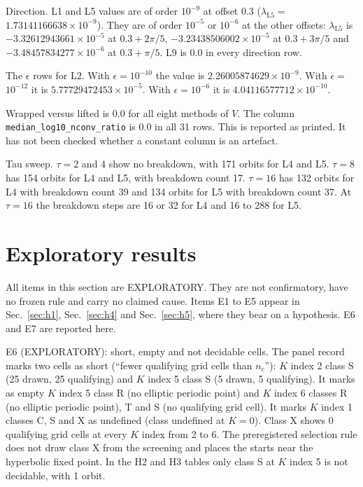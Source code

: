 \documentclass[aip,cha,reprint,amsmath,amssymb,longbibliography]{revtex4-2}
\newcommand{\sci}[2]{\ensuremath{#1\times10^{#2}}}
\newcommand{\tenp}[1]{\ensuremath{10^{#1}}}
\newcommand{\lam}[1]{\ensuremath{\lambda_{\mathrm{#1}}}}
\newcommand{\Sec}[1]{Sec.~\ref{#1}}
\begin{document}
Direction.
L1 and L5 values are of order \tenp{-9} at offset 0.3 ($\lam{L5}=$\sci{1.73141166638}{-9}).
They are of order \tenp{-5} or \tenp{-6} at the other offsets: $\lam{L5}$ is $-$\sci{3.32612943661}{-5} at $0.3+2\pi/5$, $-$\sci{3.23438506002}{-5} at $0.3+3\pi/5$ and $-$\sci{3.48457834277}{-6} at $0.3+\pi/5$.
L9 is 0.0 in every direction row.

The $\epsilon$ rows for L2.
With $\epsilon=$\tenp{-10} the value is \sci{2.26005874629}{-9}.
With $\epsilon=$\tenp{-12} it is \sci{5.77729472453}{-5}.
With $\epsilon=$\tenp{-6} it is \sci{4.04116577712}{-10}.

Wrapped versus lifted is 0.0 for all eight methods of $V$.
The column \texttt{median\_log10\_nconv\_ratio} is 0.0 in all 31 rows.
This is reported as printed.
It has not been checked whether a constant column is an artefact.

Tau sweep.
$\tau=2$ and 4 show no breakdown, with 171 orbits for L4 and L5.
$\tau=8$ has 154 orbits for L4 and L5, with breakdown count 17.
$\tau=16$ has 132 orbits for L4 with breakdown count 39 and 134 orbits for L5 with breakdown count 37.
At $\tau=16$ the breakdown steps are 16 or 32 for L4 and 16 to 288 for L5.

\section{Exploratory results}
\label{sec:expl}

All items in this section are EXPLORATORY.
They are not confirmatory, have no frozen rule and carry no claimed cause.
Items E1 to E5 appear in \Sec{sec:h1}, \Sec{sec:h4} and \Sec{sec:h5}, where they bear on a hypothesis.
E6 and E7 are reported here.

E6 (EXPLORATORY): short, empty and not decidable cells.
The panel record marks two cells as short (``fewer qualifying grid cells than $n_c$''): $K$ index 2 class S (25 drawn, 25 qualifying) and $K$ index 5 class S (5 drawn, 5 qualifying).
It marks as empty $K$ index 5 class R (no elliptic periodic point) and $K$ index 6 classes R (no elliptic periodic point), T and S (no qualifying grid cell).
It marks $K$ index 1 classes C, S and X as undefined (class undefined at $K=0$).
Class X shows 0 qualifying grid cells at every $K$ index from 2 to 6.
The preregistered selection rule does not draw class X from the screening and places the starts near the hyperbolic fixed point.
In the H2 and H3 tables only class S at $K$ index 5 is not decidable, with 1 orbit.
\end{document}
